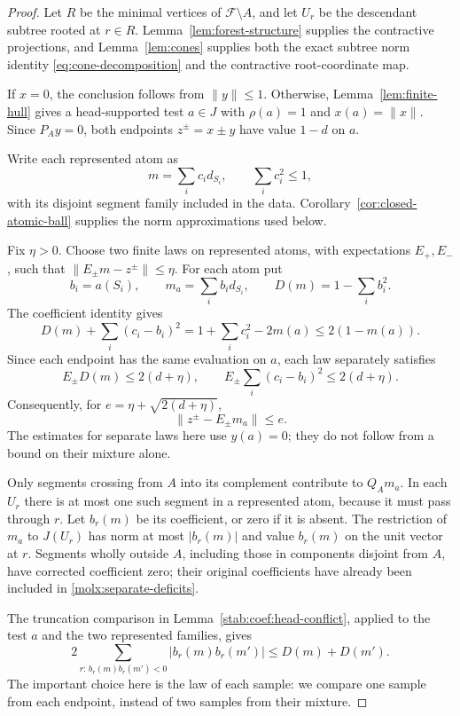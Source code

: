 \begin{proof}
Let $R$ be the minimal vertices of $\mathcal F\setminus A$, and
let $U_r$ be the descendant subtree rooted at $r\in R$.
Lemma~\ref{lem:forest-structure} supplies the contractive projections,
and Lemma~\ref{lem:cones} supplies both the exact subtree norm identity
\eqref{eq:cone-decomposition} and the contractive root-coordinate map.

If $x=0$, the conclusion follows from $\|y\|\le1$. Otherwise,
Lemma~\ref{lem:finite-hull} gives a head-supported test $a\in J$ with
$\rho(a)=1$ and $x(a)=\|x\|$. Since $P_Ay=0$, both endpoints
$z^\pm=x\pm y$ have value $1-d$ on $a$.

Write each represented atom as
\[
 m=\sum_i c_i d_{S_i},\qquad \sum_i c_i^2\le1,
\]
with its disjoint segment family included in the data.
Corollary~\ref{cor:closed-atomic-ball} supplies the norm approximations
used below.

Fix $\eta>0$. Choose two finite laws on represented atoms, with
expectations $E_+,E_-$, such that
$\|E_\pm m-z^\pm\|\le\eta$. For each atom put
\[
 b_i=a(S_i),\qquad
 m_a=\sum_i b_i d_{S_i},\qquad
 D(m)=1-\sum_i b_i^2.
\]
The coefficient identity gives
\[
 D(m)+\sum_i(c_i-b_i)^2
 =1+\sum_i c_i^2-2m(a)\le2(1-m(a)).
\]
Since each endpoint has the same evaluation on $a$, each law
separately satisfies
\begin{equation}\label{molx:separate-deficits}
 E_\pm D(m)\le2(d+\eta),\qquad
 E_\pm\sum_i(c_i-b_i)^2\le2(d+\eta).
\end{equation}
Consequently, for $e=\eta+\sqrt{2(d+\eta)}$,
\begin{equation}\label{molx:separate-error}
 \|z^\pm-E_\pm m_a\|\le e.
\end{equation}
The estimates for separate laws here use $y(a)=0$; they do not follow
from a bound on their mixture alone.

Only segments crossing from $A$ into its complement contribute to
$Q_Am_a$. In each $U_r$ there is at most one such segment in a
represented atom, because it must pass through $r$. Let $b_r(m)$ be
its coefficient, or zero if it is absent. The restriction of $m_a$ to
$J(U_r)$ has norm at most $|b_r(m)|$ and value $b_r(m)$ on the unit
vector at $r$. Segments wholly outside $A$, including those in
components disjoint from $A$, have corrected coefficient zero; their
original coefficients have already been included in
\eqref{molx:separate-deficits}.

The truncation comparison in Lemma~\ref{stab:coef:head-conflict},
applied to the test $a$ and the two represented families, gives
\begin{equation}\label{molx:cross-conflict}
 2\sum_{r:\,b_r(m)b_r(m')<0}|b_r(m)b_r(m')|
       \le D(m)+D(m').
\end{equation}
The important choice here is the law of each sample: we compare one
sample from each endpoint, instead of two samples from their mixture.


\end{proof}
